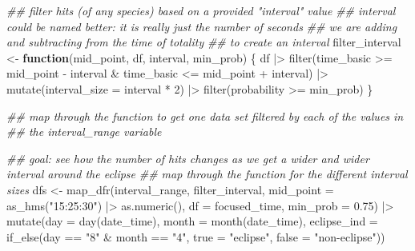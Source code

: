 \documentclass[
  letterpaper,
  DIV=11,
  numbers=noendperiod]{scrartcl}
\newenvironment{Shaded}{\begin{snugshade}}{\end{snugshade}}
\newcommand{\AttributeTok}[1]{\textcolor[rgb]{0.40,0.45,0.13}{#1}}
\newcommand{\ControlFlowTok}[1]{\textcolor[rgb]{0.00,0.23,0.31}{\textbf{#1}}}
\newcommand{\DecValTok}[1]{\textcolor[rgb]{0.68,0.00,0.00}{#1}}
\newcommand{\DocumentationTok}[1]{\textcolor[rgb]{0.37,0.37,0.37}{\textit{#1}}}
\newcommand{\FloatTok}[1]{\textcolor[rgb]{0.68,0.00,0.00}{#1}}
\newcommand{\FunctionTok}[1]{\textcolor[rgb]{0.28,0.35,0.67}{#1}}
\newcommand{\NormalTok}[1]{\textcolor[rgb]{0.00,0.23,0.31}{#1}}
\newcommand{\OtherTok}[1]{\textcolor[rgb]{0.00,0.23,0.31}{#1}}
\newcommand{\SpecialCharTok}[1]{\textcolor[rgb]{0.37,0.37,0.37}{#1}}
\newcommand{\StringTok}[1]{\textcolor[rgb]{0.13,0.47,0.30}{#1}}
\begin{document}
\linespread{2}

\linespread{0.9}

\begin{Shaded}
\begin{Highlighting}[]
\DocumentationTok{\#\# filter hits (of any species) based on a provided "interval" value}
\DocumentationTok{\#\# interval could be named better: it is really just the number of seconds}
\DocumentationTok{\#\# we are adding and subtracting from the time of totality}
\DocumentationTok{\#\# to create an interval}
\NormalTok{filter\_interval }\OtherTok{\textless{}{-}} \ControlFlowTok{function}\NormalTok{(mid\_point, df, interval, min\_prob) \{}
\NormalTok{  df }\SpecialCharTok{|\textgreater{}} \FunctionTok{filter}\NormalTok{(time\_basic }\SpecialCharTok{\textgreater{}=}\NormalTok{ mid\_point }\SpecialCharTok{{-}}\NormalTok{ interval }\SpecialCharTok{\&}\NormalTok{ time\_basic }\SpecialCharTok{\textless{}=}\NormalTok{ mid\_point }\SpecialCharTok{+}\NormalTok{ interval) }\SpecialCharTok{|\textgreater{}}
    \FunctionTok{mutate}\NormalTok{(}\AttributeTok{interval\_size =}\NormalTok{ interval }\SpecialCharTok{*} \DecValTok{2}\NormalTok{) }\SpecialCharTok{|\textgreater{}}
    \FunctionTok{filter}\NormalTok{(probability }\SpecialCharTok{\textgreater{}=}\NormalTok{ min\_prob)}
\NormalTok{\}}

\DocumentationTok{\#\# map through the function to get one data set filtered by each of the values in}
\DocumentationTok{\#\# the interval\_range variable}

\DocumentationTok{\#\# goal: see how the number of hits changes as we get a wider and wider interval around the eclipse}
\DocumentationTok{\#\# map through the function for the different interval sizes}
\NormalTok{dfs }\OtherTok{\textless{}{-}} \FunctionTok{map\_dfr}\NormalTok{(interval\_range, filter\_interval,}
               \AttributeTok{mid\_point =} \FunctionTok{as\_hms}\NormalTok{(}\StringTok{"15:25:30"}\NormalTok{) }\SpecialCharTok{|\textgreater{}} \FunctionTok{as.numeric}\NormalTok{(),}
               \AttributeTok{df =}\NormalTok{ focused\_time, }\AttributeTok{min\_prob =} \FloatTok{0.75}\NormalTok{) }\SpecialCharTok{|\textgreater{}}
                   \FunctionTok{mutate}\NormalTok{(}\AttributeTok{day =} \FunctionTok{day}\NormalTok{(date\_time),}
                          \AttributeTok{month =} \FunctionTok{month}\NormalTok{(date\_time),}
                          \AttributeTok{eclipse\_ind =} \FunctionTok{if\_else}\NormalTok{(day }\SpecialCharTok{==} \StringTok{"8"} \SpecialCharTok{\&}\NormalTok{ month }\SpecialCharTok{==} \StringTok{"4"}\NormalTok{,}
                                                \AttributeTok{true =} \StringTok{"eclipse"}\NormalTok{,}
                                        \AttributeTok{false =} \StringTok{"non{-}eclipse"}\NormalTok{))}
\end{Highlighting}
\end{Shaded}
\end{document}

